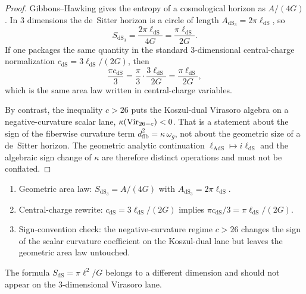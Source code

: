 \begin{proof}
Gibbons--Hawking gives the entropy of a cosmological horizon as
$A/(4G)$. In $3$ dimensions the de~Sitter horizon is a circle of length
$A_{\mathrm{dS}_3}=2\pi\ell_{\mathrm{dS}}$, so
\[
S_{\mathrm{dS}_3}
=
\frac{2\pi\ell_{\mathrm{dS}}}{4G}
=
\frac{\pi\ell_{\mathrm{dS}}}{2G}.
\]
If one packages the same quantity in the standard $3$-dimensional
central-charge normalization
$c_{\mathrm{dS}} = 3\ell_{\mathrm{dS}}/(2G)$, then
\[
\frac{\pi c_{\mathrm{dS}}}{3}
=
\frac{\pi}{3}\cdot\frac{3\ell_{\mathrm{dS}}}{2G}
=
\frac{\pi\ell_{\mathrm{dS}}}{2G},
\]
which is the same area law written in central-charge variables.

By contrast, the inequality $c>26$ puts the Koszul-dual Virasoro
algebra on a negative-curvature scalar lane,
$\kappa(\mathrm{Vir}_{26-c})<0$. That is a statement about the sign of the
fiberwise curvature term $d_{\mathrm{fib}}^2=\kappa\,\omega_g$, not
about the geometric size of a de~Sitter horizon. The geometric
analytic continuation $\ell_{\mathrm{AdS}} \mapsto i\ell_{\mathrm{dS}}$
and the algebraic sign change of $\kappa$ are therefore distinct
operations and must not be conflated.
\end{proof}

\begin{remark}
\label{rem:gravity-three-desitter-verification}
\begin{enumerate}[label=\textup{(\Alph*)}]
\item Geometric area law:
$S_{\mathrm{dS}_3}=A/(4G)$ with
$A_{\mathrm{dS}_3}=2\pi\ell_{\mathrm{dS}}$.
\item Central-charge rewrite:
$c_{\mathrm{dS}}=3\ell_{\mathrm{dS}}/(2G)$ implies
$\pi c_{\mathrm{dS}}/3=\pi\ell_{\mathrm{dS}}/(2G)$.
\item Sign-convention check:
the negative-curvature regime $c>26$ changes the sign of the scalar
curvature coefficient on the Koszul-dual lane but leaves the geometric
area law untouched.
\end{enumerate}
The formula $S_{\mathrm{dS}}=\pi\ell^2/G$ belongs to a different
dimension and should not appear on the $3$-dimensional Virasoro lane.
\end{remark}
